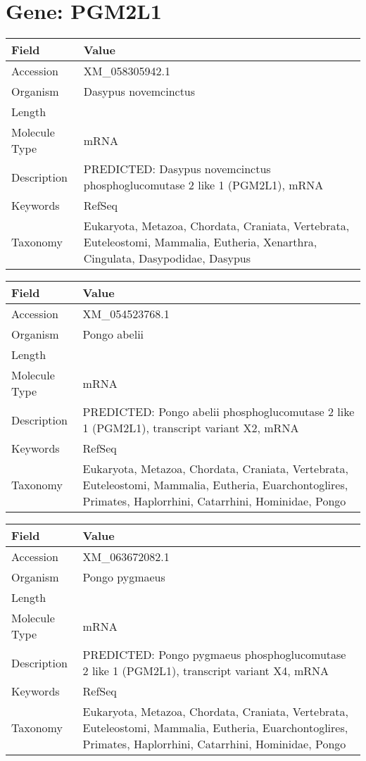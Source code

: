 \documentclass[10pt]{article}
\begin{document}
\section*{Gene: PGM2L1}
{\footnotesize
\begin{longtable}{>{\raggedright\arraybackslash}p{4.5cm} >{\raggedright\arraybackslash}p{11.5cm}}
\textbf{Field} & \textbf{Value} \\
\hline
Accession & XM\_058305942.1 \\
Organism & Dasypus novemcinctus \\
Length & 7732 \\
Molecule Type & mRNA \\
Description & PREDICTED: Dasypus novemcinctus phosphoglucomutase 2 like 1 (PGM2L1), mRNA \\
Keywords & RefSeq \\
Taxonomy & Eukaryota, Metazoa, Chordata, Craniata, Vertebrata, Euteleostomi, Mammalia, Eutheria, Xenarthra, Cingulata, Dasypodidae, Dasypus \\
\end{longtable}
}

{\footnotesize
\begin{longtable}{>{\raggedright\arraybackslash}p{4.5cm} >{\raggedright\arraybackslash}p{11.5cm}}
\textbf{Field} & \textbf{Value} \\
\hline
Accession & XM\_054523768.1 \\
Organism & Pongo abelii \\
Length & 7379 \\
Molecule Type & mRNA \\
Description & PREDICTED: Pongo abelii phosphoglucomutase 2 like 1 (PGM2L1), transcript variant X2, mRNA \\
Keywords & RefSeq \\
Taxonomy & Eukaryota, Metazoa, Chordata, Craniata, Vertebrata, Euteleostomi, Mammalia, Eutheria, Euarchontoglires, Primates, Haplorrhini, Catarrhini, Hominidae, Pongo \\
\end{longtable}
}

{\footnotesize
\begin{longtable}{>{\raggedright\arraybackslash}p{4.5cm} >{\raggedright\arraybackslash}p{11.5cm}}
\textbf{Field} & \textbf{Value} \\
\hline
Accession & XM\_063672082.1 \\
Organism & Pongo pygmaeus \\
Length & 8324 \\
Molecule Type & mRNA \\
Description & PREDICTED: Pongo pygmaeus phosphoglucomutase 2 like 1 (PGM2L1), transcript variant X4, mRNA \\
Keywords & RefSeq \\
Taxonomy & Eukaryota, Metazoa, Chordata, Craniata, Vertebrata, Euteleostomi, Mammalia, Eutheria, Euarchontoglires, Primates, Haplorrhini, Catarrhini, Hominidae, Pongo \\
\end{longtable}
}
\end{document}
